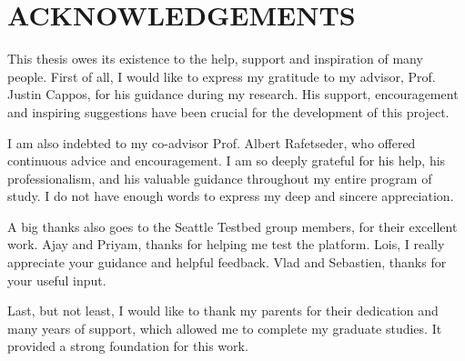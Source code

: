 \chapter*{ACKNOWLEDGEMENTS}
This thesis owes its existence to the help, support and inspiration of many people. First of all, I would like to express my gratitude to my advisor, Prof. Justin Cappos, for his guidance during my research. His support, encouragement and inspiring suggestions have been crucial for the development of this project.
					
I am also indebted to my co-advisor Prof. Albert Rafetseder, who offered continuous advice and encouragement. I am so deeply grateful for his help, his professionalism, and his valuable guidance throughout my entire program of study. I do not have enough words to express my deep and sincere appreciation.
					
A big thanks also goes to the Seattle Testbed group members, for their excellent work. Ajay and Priyam, thanks for helping me test the platform. Lois, I really appreciate your guidance and helpful feedback. Vlad and Sebastien, thanks for your useful input.
					
Last, but not least, I would like to thank my parents for their dedication and many years of support, which allowed me to complete my graduate studies. It provided a strong foundation for this work.

